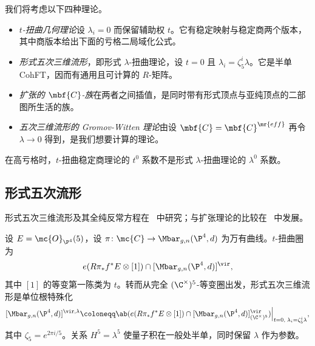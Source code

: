 我们将考虑以下四种理论。
\begin{itemize}
    \item \textit{\(t\)-扭曲几何理论}设 \(\lambda_i = 0\) 而保留辅助权 \(t\)。它有稳定映射与稳定商两个版本，其中商版本给出下面的亏格二局域化公式。
    \item \textit{形式五次三维流形}，即形式 \(\lambda\)-扭曲理论，设 \(t = 0\) 且 \(\lambda_i = \zeta_5^i \lambda\)。它是半单 CohFT，因而有通用且可计算的 \(R\)-矩阵。
    \item \textit{扩张的 \(\mbf{C}\)-族}在两者之间插值，是同时带有形式顶点与亚纯顶点的二部图所生活的族。
    \item \textit{五次三维流形的 Gromov-Witten 理论}由设 \(\mbf{C} = \mbf{C}^{\mr{eff}}\) 再令 \(\lambda \to 0\) 得到，是我们想要计算的理论。
\end{itemize}

\begin{warn}
    在高亏格时，\(t\)-扭曲稳定商理论的 \(t^0\) 系数不是形式 \(\lambda\)-扭曲理论的 \(\lambda^0\) 系数。
\end{warn}

\subsection{形式五次流形}%
\label{sub:The formal quintic}

形式五次三维流形及其全纯反常方程在~\cite{LhoPandharipande2019} 中研究；与扩张理论的比较在~\cite{GJRstructure} 中发展。

设 \(E = \mc{O}_{\P^4}(5)\)，设 \(\pi \colon \mc{C} \to \Mbar_{g,n}(\P^4,d)\) 为万有曲线。\(t\)-扭曲圈为
\[ e(R\pi_* f^* E \otimes [1]) \cap [\Mbar_{g,n}(\P^4,d)]^{\vir}, \]
其中 \([1]\) 的等变第一陈类为 \(t\)。转而从完全 \((\C^{\times})^5\)-等变圈出发，形式五次三维流形是单位根特殊化
\[ [\Mbar_{g,n}(\P^4,d)]^{\vir,\lambda} \coloneqq \ab( e(R\pi_*f^*E \otimes [1]) \cap [\Mbar_{g,n}(\P^4,d)]^{\vir}_{(\C^{\times})^5})\Big|_{t=0, \; \lambda_i = \zeta_5^i \lambda}, \]
其中 \(\zeta_5 = e^{2\pi i/5}\)。关系 \(H^5 = \lambda^5\) 使量子积在一般处半单，同时保留 \(\lambda\) 作为参数。

